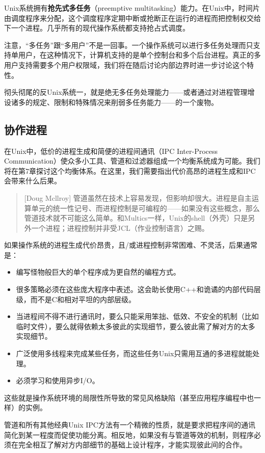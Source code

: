 \documentclass[11pt,oneside]{book}
\begin{document}
\begin{common-format}
Unix系统拥有\textbf{抢先式多任务}（preemptive multitasking）能力。在Unix中，时间片由调度程序来分配，这个调度程序定期中断或抢断正在运行的进程而把控制权交给下一个进程。几乎所有的现代操作系统都支持抢占式调度。

注意，“多任务”跟“多用户”不是一回事。一个操作系统可以进行多任务处理而只支持单用户，在这种情况下，计算机支持的是单个控制台和多个后台进程。真正的多用户支持需要多个用户权限域，我们将在随后讨论内部边界时进一步讨论这个特性。

彻头彻尾的反Unix系统一，就是绝无多任务处理能力——或者通过对进程管理增设诸多的规定、限制和特殊情况来削弱多任务能力——的一个废物。

\subsection{协作进程}
在Unix中，低价的进程生成和简便的进程间通讯（IPC Inter-Process Communication）使众多小工具、管道和过滤器组成一个均衡系统成为可能。我们将在第7章探讨这个均衡体系。在这里，我们需要指出代价高昂的进程生成和IPC会带来什么后果。

\begin{quote}[Doug Mcllroy]
管道虽然在技术上容易发现，但影响却很大。进程是自主运算单元的统一性记号、而进程控制是可编程的——如果没有这些概念，那么管道技术就不可能这么简单。和Multics一样，Unix的shell（外壳）只是另外一个进程；进程控制并非受JCL（作业控制语言）之赐。
\end{quote}

如果操作系统的进程生成代价昂贵，且/或进程控制非常困难、不灵活，后果通常是：
\begin{itemize}
\item 编写怪物般巨大的单个程序成为更自然的编程方式。
\item 很多策略必须在这些庞大程序中表述。这会助长使用C++和诡谲的内部代码层级，而不是C和相对平坦的内部层级。
\item 当进程间不得不进行通讯时，要么只能采用笨拙、低效、不安全的机制（比如临时文件），要么就得依赖太多彼此的实现细节，要么彼此需了解对方的太多实现细节。
\item 广泛使用多线程来完成某些任务，而这些任务Unix只需用互通的多进程就能处理。
\item 必须学习和使用异步I/O。
\end{itemize}

这些就是操作系统环境的局限性所导致的常见风格缺陷（甚至应用程序编程中也一样）的实例。

管道和所有其他经典Unix IPC方法有一个精微的性质，就是要求把程序间的通讯简化到某一程度而促使功能分离。相反地，如果没有与管道等效的机制，则程序必须在完全相互了解对方内部细节的基础上设计程序，才能实现彼此间的合作。


\end{common-format}
\end{document}
